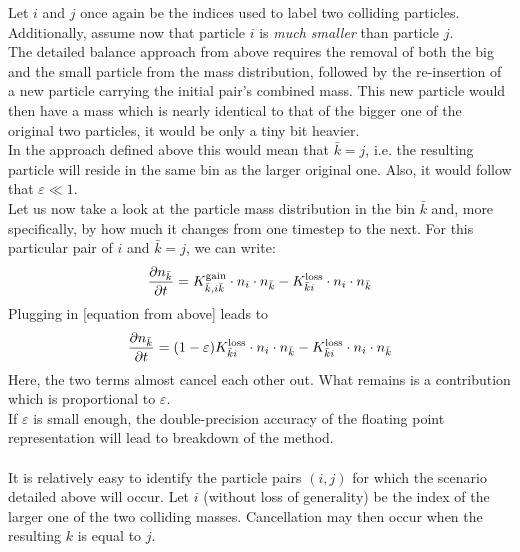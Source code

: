         Let $i$ and $j$ once again be the indices used to label two colliding particles. Additionally, 
        assume now that particle $i$ is \textit{much smaller} than particle $j$.\\
        
        The detailed balance approach from above requires the removal of both the big and the small 
        particle from the mass distribution, followed by the re-insertion of a new particle carrying the 
        initial pair's combined mass. This new particle would then have a mass which is nearly identical 
        to that of the bigger one of the original two particles, it would be only a tiny bit heavier.\\
        
        In the approach defined above this would mean that $\bar k=j$, i.e. the resulting particle will 
        reside in the same bin as the larger original one. Also, it would follow that 
        $\varepsilon\ll1$.\\
        
        Let us now take a look at the particle mass distribution in the bin $\bar k$ and, more 
        specifically, by how much it changes from one timestep to the next. For this particular pair of 
        $i$ and $\bar k=j$, we can write:
        \begin{equation}
            \frac{\partial n_{\bar k}}{\partial t}
                =K_{\bar k,i\bar k}^{\text{gain}}\cdot n_i\cdot n_{\bar k}
                -K_{\bar ki}^{\text{loss}}\cdot n_i\cdot n_{\bar k}
        \end{equation}
        Plugging in [equation from above] leads to
        \begin{equation}
            \frac{\partial n_{\bar k}}{\partial t}
                =(1-\varepsilon)K_{\bar ki}^{\text{loss}}\cdot n_i\cdot n_{\bar k}
                -K_{\bar ki}^{\text{loss}}\cdot n_i\cdot n_{\bar k}
        \end{equation}
        Here, the two terms almost cancel each other out. What remains is a contribution which is 
        proportional to $\varepsilon$.\\
        
        If $\varepsilon$ is small enough, the double-precision accuracy of the floating point 
        representation will lead to breakdown of the method.\\
        \\
        
        It is relatively easy to identify the particle pairs $(i,j)$ for which the scenario detailed 
        above will occur. Let $i$ (without loss of generality) be the index of the larger one of the two 
        colliding masses. Cancellation may then occur when the resulting $k$ is equal to $j$.\\
        
